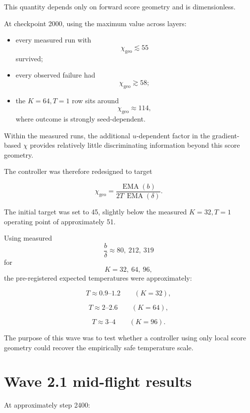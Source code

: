 \documentclass[11pt,a4paper]{article}
\newcommand{\chigeo}{\chi_{\mathrm{geo}}}
\newcommand{\EMA}{\operatorname{EMA}}
\begin{document}
This quantity depends only on forward score geometry and is dimensionless.

At checkpoint 2000, using the maximum value across layers:

\begin{itemize}[leftmargin=1.4em]

\item every measured run with
\[
\chigeo\lesssim55
\]
survived;

\item every observed failure had
\[
\chigeo\gtrsim58;
\]

\item the \(K=64,T=1\) row sits around
\[
\chigeo\approx114,
\]
where outcome is strongly seed-dependent.
\end{itemize}

Within the measured runs, the additional \(u\)-dependent factor in the
gradient-based \(\chi\) provides relatively little discriminating information
beyond this score geometry.

The controller was therefore redesigned to target

\[
\chigeo
=
\frac{\EMA(b)}
{2T\,\EMA(\delta)}.
\]

The initial target was set to 45, slightly below the measured
\(K=32,T=1\) operating point of approximately 51.

Using measured
\[
\frac{b}{\delta}
\approx
80,\ 212,\ 319
\]
for
\[
K=32,\ 64,\ 96,
\]
the pre-registered expected temperatures were approximately:

\[
T\approx0.9\text{--}1.2
\qquad
(K=32),
\]

\[
T\approx2\text{--}2.6
\qquad
(K=64),
\]

\[
T\approx3\text{--}4
\qquad
(K=96).
\]

The purpose of this wave was to test whether a controller using only local
score geometry could recover the empirically safe temperature scale.


\section{Wave 2.1 mid-flight results}

At approximately step 2400:
\end{document}

